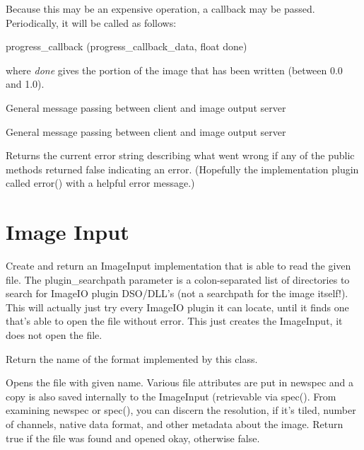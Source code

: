 Because this may be an expensive operation, a callback may be passed.
Periodically, it will be called as follows:\\
\begin{code}
  progress_callback (progress_callback_data, float done)
\end{code}
\noindent where \emph{done} gives the portion of the image that has
been written (between 0.0 and 1.0).

\apiend

General message passing between client and image output server
\apiend

General message passing between client and image output server
\apiend

Returns the current error string describing what went wrong if
any of the public methods returned {\kw false} indicating an error.
(Hopefully the implementation plugin called {\kw error()} with a
helpful error message.)
\apiend


\section{Image Input}

Create and return an {\kw ImageInput} implementation that is able
to read the given file.  The {\kw plugin_searchpath} parameter is a
colon-separated list of directories to search for ImageIO plugin
DSO/DLL's (not a searchpath for the image itself!).  This will
actually just try every ImageIO plugin it can locate, until it
finds one that's able to open the file without error.  This just
creates the {\kw ImageInput}, it does not open the file.
\apiend

Return the name of the format implemented by this class.
\apiend

Opens the file with given name.  Various file attributes are put in
{\kw newspec} and a copy is also saved internally to the
{\kw ImageInput} (retrievable via {\kw spec()}.  From examining
{\kw newspec} or {\kw spec()}, you can discern the resolution, if it's
tiled, number of channels, native data format, and other metadata about
the image.  Return {\kw true} if the file was found and opened okay,
otherwise {\kw false}.
\apiend

